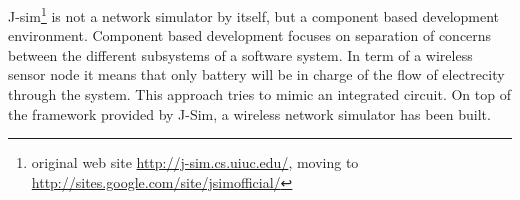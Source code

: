 \label{subsec:jsim}
J-sim\footnote {original web site \url{http://j-sim.cs.uiuc.edu/}, moving to 
\url{http://sites.google.com/site/jsimofficial/}} is not a network simulator
by itself, but a component based development environment. Component based
development focuses on separation of concerns between the different subsystems
of a software system. In term of a wireless sensor node it means that only 
battery will be in charge of the flow of electrecity through the system.
This approach tries to mimic an integrated circuit. On top of the framework 
provided by J-Sim, a wireless network simulator has been built.


